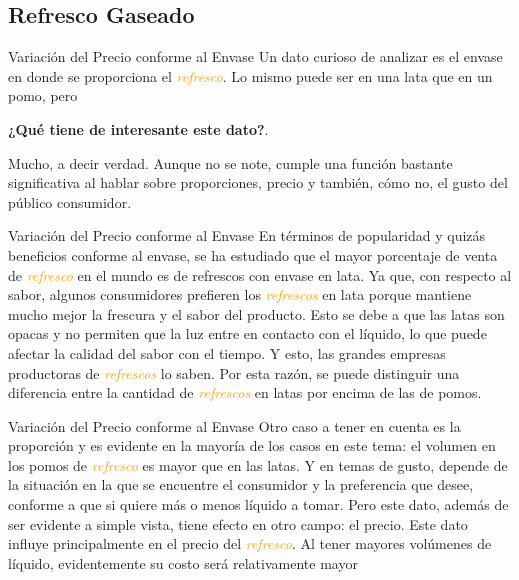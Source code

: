 \subsection{Refresco Gaseado}
\begin{frame}[fragile]{Variación del Precio conforme al Envase}
  Un dato curioso de analizar es el envase en donde se proporciona el \textit{\Large\textcolor{orange}{refresco}}. 
  Lo mismo puede ser en una lata que en un pomo, pero 
  
  \begin{center}
    \textbf{\Large ¿Qué tiene de interesante este dato?}. 
  \end{center}
    
  
  Mucho, a decir verdad. 
  Aunque no se note, cumple una función bastante significativa al hablar sobre proporciones, precio y también, cómo no, el gusto del público consumidor.
\end{frame}

\begin{frame}[fragile]{Variación del Precio conforme al Envase}
  En términos de popularidad y quizás beneficios conforme al envase, se ha estudiado que el mayor porcentaje de venta de \textit{\Large\textcolor{orange}{refresco}} en el mundo es de refrescos con envase en lata. 
  Ya que, con respecto al sabor, algunos consumidores prefieren los \textit{\Large\textcolor{orange}{refrescos}} en lata porque mantiene mucho mejor la frescura y el sabor del producto. 
  Esto se debe a que las latas son opacas y no permiten que la luz entre en contacto con el líquido, lo que puede afectar la calidad del sabor con el tiempo. 
  Y esto, las grandes empresas productoras de \textit{\Large\textcolor{orange}{refrescos}} lo saben. 
  Por esta razón, se puede distinguir una diferencia entre la cantidad de \textit{\Large\textcolor{orange}{refrescos}} en latas por encima de las de pomos.
\end{frame}

\begin{frame}[fragile]{Variación del Precio conforme al Envase}
  Otro caso a tener en cuenta es la proporción y es evidente en la mayoría de los casos en este tema: el volumen en los pomos de \textit{\Large\textcolor{orange}{refresco}} es mayor que en las latas. 
  Y en temas de gusto, depende de la situación en la que se encuentre el consumidor y la preferencia que desee, conforme a que si quiere más o menos líquido a tomar. 
  Pero este dato, además de ser evidente a simple vista, tiene efecto en otro campo: el precio. 
  Este dato influye principalmente en el precio del \textit{\Large\textcolor{orange}{refresco}}. 
  Al tener mayores volúmenes de líquido, evidentemente su costo será relativamente mayor
\end{frame}

